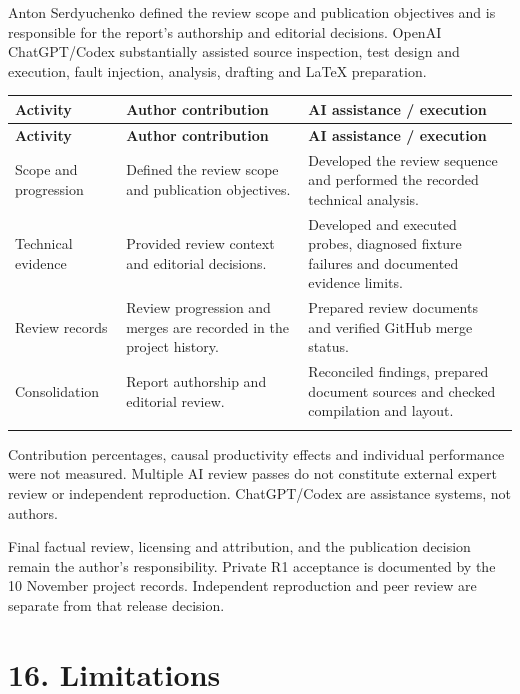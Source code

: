 \documentclass[11pt,a4paper]{article}
\begin{document}
Anton Serdyuchenko defined the review scope and publication objectives and is responsible for the report's authorship and editorial decisions. OpenAI ChatGPT/\allowbreak{}Codex substantially assisted source inspection, test design and execution, fault injection, analysis, drafting and LaTeX preparation.

{\fontsize{9.5}{11.5}\selectfont
\begin{longtable}{@{}>{\raggedright\arraybackslash}p{}>{\raggedright\arraybackslash}p{}>{\raggedright\arraybackslash}p{}@{}}\toprule
\textbf{Activity} & \textbf{Author contribution} & \textbf{AI assistance /\allowbreak{} execution} \\ \midrule\endfirsthead
\toprule\textbf{Activity} & \textbf{Author contribution} & \textbf{AI assistance /\allowbreak{} execution} \\ \midrule\endhead
\bottomrule\endfoot
Scope and progression & Defined the review scope and publication objectives. & Developed the review sequence and performed the recorded technical analysis. \\ \addlinespace[3pt]
Technical evidence & Provided review context and editorial decisions. & Developed and executed probes, diagnosed fixture failures and documented evidence limits. \\ \addlinespace[3pt]
Review records & Review progression and merges are recorded in the project history. & Prepared review documents and verified GitHub merge status. \\ \addlinespace[3pt]
Consolidation & Report authorship and editorial review. & Reconciled findings, prepared document sources and checked compilation and layout. \\ \addlinespace[3pt]
\end{longtable}}

Contribution percentages, causal productivity effects and individual performance were not measured. Multiple AI review passes do not constitute external expert review or independent reproduction. ChatGPT/\allowbreak{}Codex are assistance systems, not authors.

Final factual review, licensing and attribution, and the publication decision remain the author's responsibility. Private R1 acceptance is documented by the 10 November project records. Independent reproduction and peer review are separate from that release decision.

\section*{16. Limitations}
\end{document}
